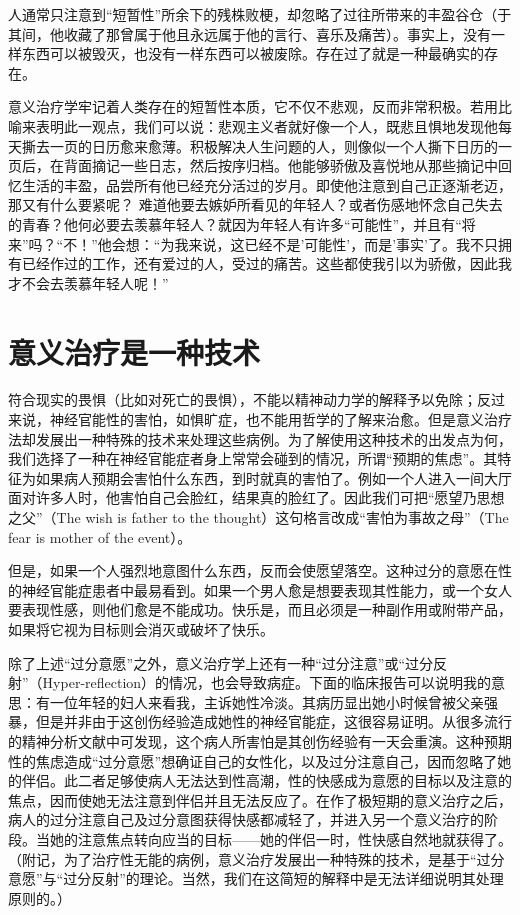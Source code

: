 \documentclass[11pt,oneside]{book}
\begin{document}
\begin{common-format}
人通常只注意到“短暂性”所余下的残株败梗，却忽略了过往所带来的丰盈谷仓（于其间，他收藏了那曾属于他且永远属于他的言行、喜乐及痛苦）。事实上，没有一样东西可以被毁灭，也没有一样东西可以被废除。存在过了就是一种最确实的存在。

意义治疗学牢记着人类存在的短暂性本质，它不仅不悲观，反而非常积极。若用比喻来表明此一观点，我们可以说：悲观主义者就好像一个人，既悲且惧地发现他每天撕去一页的日历愈来愈薄。积极解决人生问题的人，则像似一个人撕下日历的一页后，在背面摘记一些日志，然后按序归档。他能够骄傲及喜悦地从那些摘记中回忆生活的丰盈，品尝所有他已经充分活过的岁月。即使他注意到自己正逐渐老迈，那又有什么要紧呢？ 难道他要去嫉妒所看见的年轻人？或者伤感地怀念自己失去的青春？他何必要去羡慕年轻人？就因为年轻人有许多“可能性”，并且有“将来”吗？“不！”他会想：“为我来说，这已经不是'可能性'，而是'事实'了。我不只拥有已经作过的工作，还有爱过的人，受过的痛苦。这些都使我引以为骄傲，因此我才不会去羡慕年轻人呢！”


\section{意义治疗是一种技术}
符合现实的畏惧（比如对死亡的畏惧），不能以精神动力学的解释予以免除；反过来说，神经官能性的害怕，如惧旷症，也不能用哲学的了解来治愈。但是意义治疗法却发展出一种特殊的技术来处理这些病例。为了解使用这种技术的出发点为何，我们选择了一种在神经官能症者身上常常会碰到的情况，所谓“预期的焦虑”。其特征为如果病人预期会害怕什么东西，到时就真的害怕了。例如一个人进入一间大厅面对许多人时，他害怕自己会脸红，结果真的脸红了。因此我们可把“愿望乃思想之父”（The wish is father to the thought）这句格言改成“害怕为事故之母”（The fear is mother of the event）。

但是，如果一个人强烈地意图什么东西，反而会使愿望落空。这种过分的意愿在性的神经官能症患者中最易看到。如果一个男人愈是想要表现其性能力，或一个女人要表现性感，则他们愈是不能成功。快乐是，而且必须是一种副作用或附带产品，如果将它视为目标则会消灭或破坏了快乐。

除了上述“过分意愿”之外，意义治疗学上还有一种“过分注意”或“过分反射”（Hyper-reflection）的情况，也会导致病症。下面的临床报告可以说明我的意思：有一位年轻的妇人来看我，主诉她性冷淡。其病历显出她小时候曾被父亲强暴，但是并非由于这创伤经验造成她性的神经官能症，这很容易证明。从很多流行的精神分析文献中可发现，这个病人所害怕是其创伤经验有一天会重演。这种预期性的焦虑造成“过分意愿”想确证自己的女性化，以及过分注意自己，因而忽略了她的伴侣。此二者足够使病人无法达到性高潮，性的快感成为意愿的目标以及注意的焦点，因而使她无法注意到伴侣并且无法反应了。在作了极短期的意义治疗之后，病人的过分注意自己及过分意图获得快感都减轻了，并进入另一个意义治疗的阶段。当她的注意焦点转向应当的目标——她的伴侣一时，性快感自然地就获得了。（附记，为了治疗性无能的病例，意义治疗发展出一种特殊的技术，是基于“过分意愿”与“过分反射”的理论。当然，我们在这简短的解释中是无法详细说明其处理原则的。）


\end{common-format}
\end{document}
